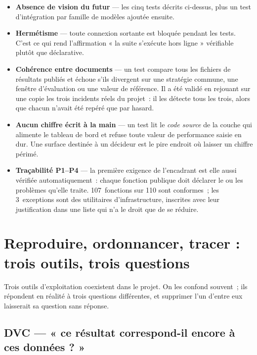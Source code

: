 \begin{itemize}
  \item \textbf{Absence de vision du futur} — les cinq tests décrits ci-dessus,
        plus un test d'intégration par famille de modèles ajoutée ensuite.
  \item \textbf{Hermétisme} — toute connexion sortante est bloquée pendant les
        tests. C'est ce qui rend l'affirmation « la suite s'exécute hors ligne »
        vérifiable plutôt que déclarative.
  \item \textbf{Cohérence entre documents} — un test compare tous les fichiers de
        résultats publiés et échoue s'ils divergent sur une stratégie commune,
        une fenêtre d'évaluation ou une valeur de référence. Il a été validé en
        rejouant sur une copie les trois incidents réels du projet~: il les
        détecte tous les trois, alors que chacun n'avait été repéré que par
        hasard.
  \item \textbf{Aucun chiffre écrit à la main} — un test lit le \emph{code source}
        de la couche qui alimente le tableau de bord et refuse toute valeur de
        performance saisie en dur. Une surface destinée à un décideur est le pire
        endroit où laisser un chiffre périmé.
  \item \textbf{Traçabilité P1--P4} — la première exigence de l'encadrant est
        elle aussi vérifiée automatiquement~: chaque fonction publique doit
        déclarer le ou les problèmes qu'elle traite. 107~fonctions sur 110 sont
        conformes~; les 3~exceptions sont des utilitaires d'infrastructure,
        inscrites avec leur justification dans une liste qui n'a le droit que de
        se réduire.
\end{itemize}

\section{Reproduire, ordonnancer, tracer : trois outils, trois questions}

Trois outils d'exploitation coexistent dans le projet. On les confond souvent~;
ils répondent en réalité à trois questions différentes, et supprimer l'un
d'entre eux laisserait sa question sans réponse.

\subsection{DVC — « ce résultat correspond-il encore à ces données ? »}

